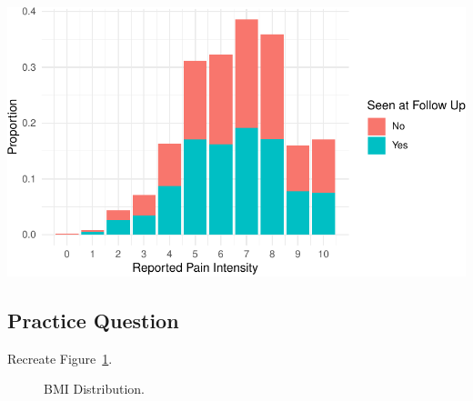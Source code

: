 \documentclass[
  letterpaper,
]{krantz}
\begin{document}
\begin{center}
\includegraphics[width=1\textwidth,height=\textheight]{book/visualization_ggplot_files/figure-pdf/unnamed-chunk-18-1.pdf}
\end{center}

\subsection{Practice Question}\label{practice-question-14}

Recreate Figure~\ref{fig-bmi-distribution}.

\begin{figure}


\caption{\label{fig-bmi-distribution}BMI Distribution.}

\end{figure}%
\end{document}
